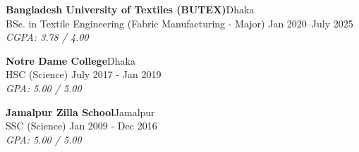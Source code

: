 

      \textbf{Bangladesh University of Textiles (BUTEX)}\hfill Dhaka\\
      \vspace{1mm}
      BSc. in Textile Engineering (Fabric Manufacturing - Major) \hfill Jan 2020--July 2025\\
      \vspace{1mm}
      \textit{CGPA: 3.78 / 4.00}
      \vspace{3mm}

      \textbf{Notre Dame College}\hfill Dhaka\\
      \vspace{1mm}
      HSC (Science) \hfill July 2017 - Jan 2019\\
       \vspace{1mm}
       \textit{GPA: 5.00 / 5.00}
       \vspace{3mm}

      \textbf{Jamalpur Zilla School}\hfill Jamalpur\\
      \vspace{1mm}
       SSC (Science) \hfill Jan 2009 - Dec 2016\\
      \vspace{1mm}
      \textit{GPA: 5.00 / 5.00}
